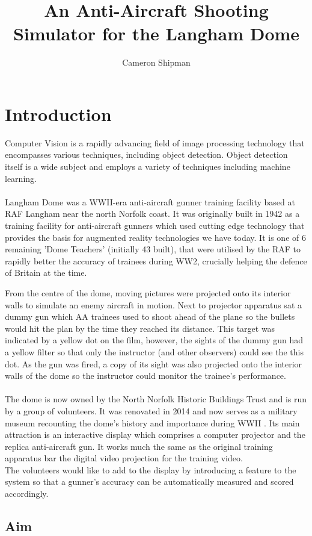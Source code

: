 \documentclass[final]{cmpreport_02}
\title{An Anti-Aircraft Shooting Simulator for the Langham Dome}
\author{Cameron Shipman}
\begin{document}
\section{Introduction}

Computer Vision is a rapidly advancing field of image processing technology that encompasses various techniques, including object detection. Object detection itself is a wide subject and employs a variety of techniques including machine learning.
\\\\
Langham Dome was a WWII-era anti-aircraft gunner training facility based at RAF Langham near the north Norfolk coast. It was originally built in 1942 as a training facility for anti-aircraft gunners which used cutting edge technology that provides the basis for augmented reality technologies we have today. It is one of 6 remaining 'Dome Teachers' (initially 43 built), that were utilised by the RAF to rapidly better the accuracy of trainees during WW2, crucially helping the defence of Britain at the time. \citep{langhamGroup}

From the centre of the dome, moving pictures were projected onto its interior walls to simulate an enemy aircraft in motion. Next to projector apparatus sat a dummy gun which AA trainees used to shoot ahead of the plane so the bullets would hit the plan by the time they reached its distance. This target was indicated by a yellow dot on the film,
however, the sights of the dummy gun had a yellow filter so that only the instructor (and other observers) could see the this dot. As the gun was fired, a copy of its sight was also projected onto the interior walls of the dome so the instructor could monitor the trainee’s performance.
\\\\
The dome is now owned by the North Norfolk Historic Buildings Trust and is run by a group of volunteers. It was renovated in 2014 and now serves as a military museum recounting the dome's history and importance during WWII \citep{langhamGroup}. Its main attraction is an interactive display which comprises a computer projector and the replica anti-aircraft gun. It works much the same as the original training apparatus bar the digital video projection for the training video.
\\
The volunteers would like to add to the display by introducing a feature to the system so that a gunner's accuracy can be automatically measured and scored accordingly. 


\subsection{Aim}
\end{document}
